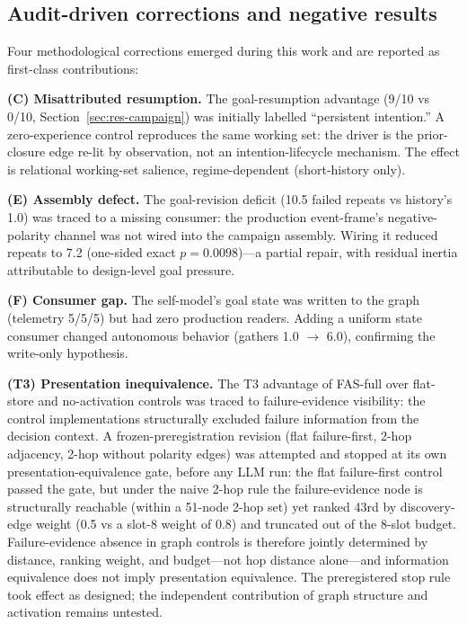 \documentclass[10pt]{article}
\begin{document}
\subsection{Audit-driven corrections and negative results}
\label{sec:audit-negative}

Four methodological corrections emerged during this work and are
reported as first-class contributions:

\textbf{(C) Misattributed resumption.} The goal-resumption advantage
(9/10 vs 0/10, Section~\ref{sec:res-campaign}) was initially labelled
``persistent intention.'' A zero-experience control reproduces the same
working set: the driver is the prior-closure edge re-lit by observation,
not an intention-lifecycle mechanism. The effect is relational
working-set salience, regime-dependent (short-history only).

\textbf{(E) Assembly defect.} The goal-revision deficit (10.5 failed
repeats vs history's 1.0) was traced to a missing consumer: the
production event-frame's negative-polarity channel was not wired into
the campaign assembly. Wiring it reduced repeats to 7.2
(one-sided exact $p{=}0.0098$)---a partial repair, with residual inertia attributable
to design-level goal pressure.

\textbf{(F) Consumer gap.} The self-model's goal state was written to
the graph (telemetry 5/5/5) but had zero production readers. Adding a
uniform state consumer changed autonomous behavior (gathers 1.0
$\rightarrow$ 6.0), confirming the write-only hypothesis.

\textbf{(T3) Presentation inequivalence.} The T3 advantage of FAS-full
over flat-store and no-activation controls was traced to
failure-evidence visibility: the control implementations structurally
excluded failure information from the decision context. A
frozen-preregistration revision (flat failure-first, 2-hop adjacency,
2-hop without polarity edges) was attempted and stopped at its own
presentation-equivalence gate, before any LLM run: the flat
failure-first control passed the gate, but under the naive 2-hop rule
the failure-evidence node is structurally reachable (within a 51-node
2-hop set) yet ranked 43rd by discovery-edge weight (0.5 vs a slot-8
weight of 0.8) and truncated out of the 8-slot budget. Failure-evidence
absence in graph controls is therefore jointly determined by distance,
ranking weight, and budget---not hop distance alone---and information
equivalence does not imply presentation equivalence. The preregistered
stop rule took effect as designed; the independent contribution of
graph structure and activation remains untested.
\end{document}
